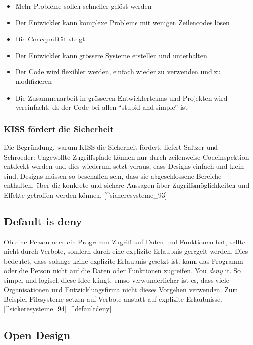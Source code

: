 \begin{itemize}
\tightlist
\item
  Mehr Probleme sollen schneller gelöst werden
\item
  Der Entwickler kann komplexe Probleme mit wenigen Zeilencodes lösen
\item
  Die Codequalität steigt
\item
  Der Entwickler kann grössere Systeme erstellen und unterhalten
\item
  Der Code wird flexibler werden, einfach wieder zu verwenden und zu
  modifizieren
\item
  Die Zusammenarbeit in grösseren Entwicklerteams und Projekten wird
  vereinfacht, da der Code bei allen ``stupid and simple'' ist
\end{itemize}

\subsubsection{KISS fördert die
Sicherheit}\label{kiss-fuxf6rdert-die-sicherheit}

Die Begründung, warum KISS die Sicherheit fördert, liefert Saltzer und
Schroeder: Ungewollte Zugriffspfade können nur durch zeilenweise
Codeinspektion entdeckt werden und dies wiederum setzt voraus, dass
Designs einfach und klein sind. Designs müssen so beschaffen sein, dass
sie abgeschlossene Bereiche enthalten, über die konkrete und sichere
Aussagen über Zugriffsmöglichkeiten und Effekte getroffen werden können.
{[}\^{}sicheresysteme\_93{]}

\subsection{Default-is-deny}\label{default-is-deny}

Ob eine Person oder ein Programm Zugriff auf Daten und Funktionen hat,
sollte nicht durch Verbote, sondern durch eine explizite Erlaubnis
geregelt werden. Dies bedeutet, dass solange keine explizite Erlaubnis
gesetzt ist, kann das Programm oder die Person nicht auf die Daten oder
Funktionen zugreifen. You \emph{deny} it. So simpel und logisch diese
Idee klingt, umso verwunderlicher ist es, dass viele Organisationen und
Entwicklungsfirma nicht dieses Vorgehen verwenden. Zum Beispiel
Filesysteme setzen auf Verbote anstatt auf explizite
Erlaubnisse.{[}\^{}sicheresysteme\_94{]} {[}\^{}defaultdeny{]}

\subsection{Open Design}\label{open-design}


